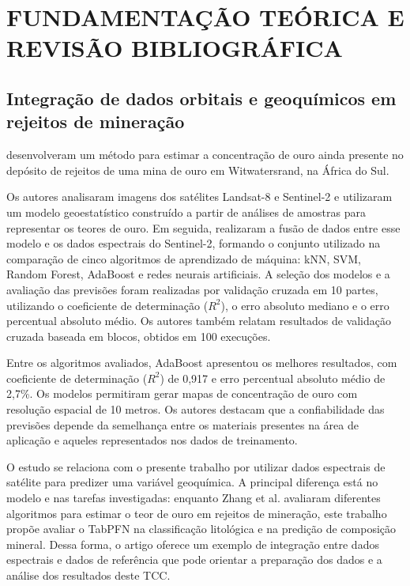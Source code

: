 \chapter{FUNDAMENTAÇÃO TEÓRICA E REVISÃO BIBLIOGRÁFICA}
\label{chap:fundamentacao}

\section{Integração de dados orbitais e geoquímicos em rejeitos de mineração}

 desenvolveram um método para estimar a concentração de ouro ainda presente no depósito de rejeitos de uma mina de ouro em Witwatersrand, na África do Sul.

Os autores analisaram imagens dos satélites Landsat-8 e Sentinel-2 e utilizaram um modelo geoestatístico construído a partir de análises de amostras para representar os teores de ouro. Em seguida, realizaram a fusão de dados entre esse modelo e os dados espectrais do Sentinel-2, formando o conjunto utilizado na comparação de cinco algoritmos de aprendizado de máquina: kNN, SVM, Random Forest, AdaBoost e redes neurais artificiais. A seleção dos modelos e a avaliação das previsões foram realizadas por validação cruzada em 10 partes, utilizando o coeficiente de determinação ($R^2$), o erro absoluto mediano e o erro percentual absoluto médio. Os autores também relatam resultados de validação cruzada baseada em blocos, obtidos em 100 execuções.

Entre os algoritmos avaliados, AdaBoost apresentou os melhores resultados, com coeficiente de determinação ($R^2$) de 0,917 e erro percentual absoluto médio de 2,7\%. Os modelos permitiram gerar mapas de concentração de ouro com resolução espacial de 10 metros. Os autores destacam que a confiabilidade das previsões depende da semelhança entre os materiais presentes na área de aplicação e aqueles representados nos dados de treinamento.

O estudo se relaciona com o presente trabalho por utilizar dados espectrais de satélite para predizer uma variável geoquímica. A principal diferença está no modelo e nas tarefas investigadas: enquanto Zhang et al. avaliaram diferentes algoritmos para estimar o teor de ouro em rejeitos de mineração, este trabalho propõe avaliar o TabPFN na classificação litológica e na predição de composição mineral. Dessa forma, o artigo oferece um exemplo de integração entre dados espectrais e dados de referência que pode orientar a preparação dos dados e a análise dos resultados deste TCC.
